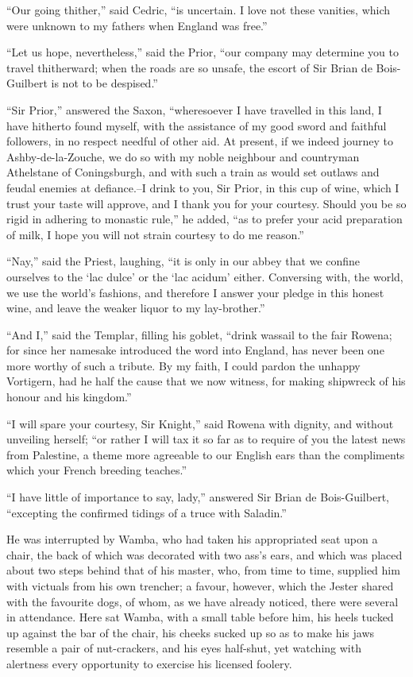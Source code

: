 ``Our going thither,'' said Cedric, ``is uncertain. I love not these
vanities, which were unknown to my fathers when England was free.''

``Let us hope, nevertheless,'' said the Prior, ``our company may
determine you to travel thitherward; when the roads are so unsafe, the
escort of Sir Brian de Bois-Guilbert is not to be despised.''

``Sir Prior,'' answered the Saxon, ``wheresoever I have travelled in
this land, I have hitherto found myself, with the assistance of my good
sword and faithful followers, in no respect needful of other aid. At
present, if we indeed journey to Ashby-de-la-Zouche, we do so with my
noble neighbour and countryman Athelstane of Coningsburgh, and with such
a train as would set outlaws and feudal enemies at defiance.--I drink to
you, Sir Prior, in this cup of wine, which I trust your taste will
approve, and I thank you for your courtesy. Should you be so rigid in
adhering to monastic rule,'' he added, ``as to prefer your acid
preparation of milk, I hope you will not strain courtesy to do me
reason.''

``Nay,'' said the Priest, laughing, ``it is only in our abbey that we
confine ourselves to the `lac dulce' or the `lac acidum' either.
Conversing with, the world, we use the world's fashions, and therefore I
answer your pledge in this honest wine, and leave the weaker liquor to
my lay-brother.''

``And I,'' said the Templar, filling his goblet, ``drink wassail to the
fair Rowena; for since her namesake introduced the word into England,
has never been one more worthy of such a tribute. By my faith, I could
pardon the unhappy Vortigern, had he half the cause that we now witness,
for making shipwreck of his honour and his kingdom.''

``I will spare your courtesy, Sir Knight,'' said Rowena with dignity,
and without unveiling herself; ``or rather I will tax it so far as to
require of you the latest news from Palestine, a theme more agreeable to
our English ears than the compliments which your French breeding
teaches.''

``I have little of importance to say, lady,'' answered Sir Brian de
Bois-Guilbert, ``excepting the confirmed tidings of a truce with
Saladin.''

He was interrupted by Wamba, who had taken his appropriated seat upon a
chair, the back of which was decorated with two ass's ears, and which
was placed about two steps behind that of his master, who, from time to
time, supplied him with victuals from his own trencher; a favour,
however, which the Jester shared with the favourite dogs, of whom, as we
have already noticed, there were several in attendance. Here sat Wamba,
with a small table before him, his heels tucked up against the bar of
the chair, his cheeks sucked up so as to make his jaws resemble a pair
of nut-crackers, and his eyes half-shut, yet watching with alertness
every opportunity to exercise his licensed foolery.

